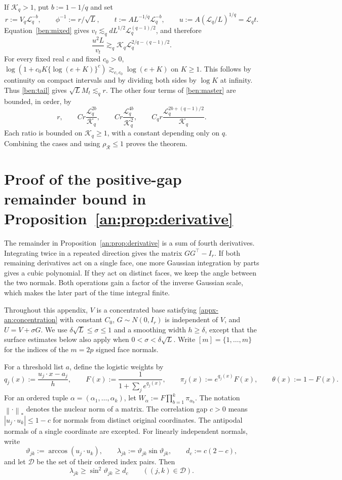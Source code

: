 \documentclass[11pt,letterpaper]{article}
\theoremstyle{remark}
\newcommand{\cD}{\mathcal D}
\newcommand{\norm}[1]{\left\lVert#1\right\rVert}
\newcommand{\rh}{\rho_{\mathcal R}}
\begin{document}
If \(\mathcal K_q>1\), put \(b:=1-1/q\) and set
\[
 r:=V_q \mathcal{L}_q^{-b},\qquad \phi^{-1}:=r/\sqrt L,\qquad
 t:=AL^{-1/q}\mathcal{L}_q^{-b},\qquad u:=A(\mathcal{L}_q/L)^{1/q}=\mathcal{L}_q t.
\]
Equation~\eqref{ben:mixed} gives
\(v_t\lesssim_q dL^{1/2}\mathcal{L}_q^{(q-1)/2}\), and therefore
\[
 \frac{u^2L}{v_t}\gtrsim_q
 \mathcal K_q \mathcal{L}_q^{2/q-(q-1)/2}.
\]
For every fixed real \(c\) and fixed \(c_0>0\),
\(\log(1+c_0K\{\log(e+K)\}^c)\gtrsim_{c,c_0}\log(e+K)\)
on \(K\ge1\). This follows by continuity on compact intervals and
by dividing both sides by \(\log K\) at infinity. Thus
\eqref{ben:tail} gives \(\sqrt L M_t\lesssim_q r\).
The other four terms of \eqref{ben:master} are bounded, in order, by
\[
 r,\qquad C r\frac{\mathcal{L}_q^{2b}}{\mathcal K_q},\qquad
 C r\frac{\mathcal{L}_q^{4b}}{\mathcal K_q^2},\qquad
 C_q r\frac{\mathcal{L}_q^{2b+(q-1)/2}}{\mathcal K_q}.
\]
Each ratio is bounded on \(\mathcal K_q\ge1\), with a constant depending only
on \(q\). Combining the cases and using \(\rh\le1\) proves the
theorem.


\clearpage
\section{Proof of the positive-gap remainder bound in Proposition~\ref*{an:prop:derivative}}\label{app:h3}

The remainder in Proposition~\ref{an:prop:derivative} is a sum of
fourth derivatives. Integrating twice in a repeated direction gives the
matrix \(GG^\top-I_r\). If both remaining derivatives act on a single
face, one more Gaussian integration by parts gives a cubic polynomial.
If they act on distinct faces, we keep the angle between the two
normals. Both operations gain a factor of the inverse Gaussian scale,
which makes the later part of the time integral finite.

Throughout this appendix, \(V\) is a concentrated base satisfying
\eqref{appx-an:concentration} with constant \(C_0\), \(G\sim N(0,I_r)\)
is independent of \(V\), and \(U=V+\sigma G\). We use
\(\delta\sqrt L\le\sigma\le1\) and a smoothing width \(h\ge\delta\),
except that the surface estimates below also apply when
\(0<\sigma<\delta\sqrt L\). Write \([m]=\{1,\ldots,m\}\) for the
indices of the \(m=2p\) signed face normals.

For a threshold list $a$, define the logistic weights by
\[
 q_j(x):=\frac{u_j\cdot x-a_j}{h},\qquad
 F(x):=\frac1{1+\sum_j e^{q_j(x)}},\qquad
 \pi_j(x):=e^{q_j(x)}F(x),\qquad \theta(x):=1-F(x).
\]
For an ordered tuple $\alpha=(\alpha_1,\ldots,\alpha_k)$, let
$W_\alpha:=F\prod_{b=1}^k\pi_{\alpha_b}$.
The notation $\norm{\cdot}_*$ denotes the nuclear norm of a matrix.
The correlation gap $c>0$ means
$|u_j\cdot u_k|\le1-c$ for normals from distinct original coordinates.
The antipodal normals of a single coordinate are excepted. For
linearly independent normals, write
\[
 \vartheta_{jk}:=\arccos(u_j\cdot u_k),\qquad
 \lambda_{jk}:=\vartheta_{jk}\sin\vartheta_{jk},\qquad
 d_c:=c(2-c),
\]
and let $\cD$ be the set of their ordered index pairs. Then
\begin{equation}
 \lambda_{jk}\ge\sin^2\vartheta_{jk}\ge d_c
 \qquad((j,k)\in\cD).
 \label{h3:eq:gap}
\end{equation}
\end{document}
